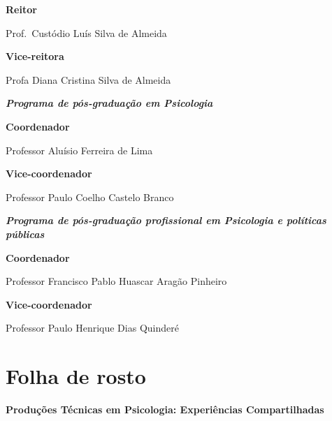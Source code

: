 \documentclass[
  letterpaper,
  DIV=11,
  numbers=noendperiod,
  oneside]{scrreprt}
\begin{document}
\textbf{Reitor}

Prof.~Custódio Luís Silva de Almeida

\textbf{Vice-reitora}

Profa Diana Cristina Silva de Almeida

\textbf{\emph{Programa de pós-graduação em Psicologia}}

\textbf{Coordenador}

Professor Aluísio Ferreira de Lima

\textbf{Vice-coordenador}

Professor Paulo Coelho Castelo Branco

\textbf{\emph{Programa de pós-graduação profissional em Psicologia e
políticas públicas}}


\textbf{Coordenador}

Professor Francisco Pablo Huascar Aragão Pinheiro

\textbf{Vice-coordenador}

Professor Paulo Henrique Dias Quinderé


\hypertarget{folha-de-rosto}{%
\chapter*{Folha de rosto}\label{folha-de-rosto}}


\textbf{Produções Técnicas em Psicologia: Experiências Compartilhadas}
\end{document}
